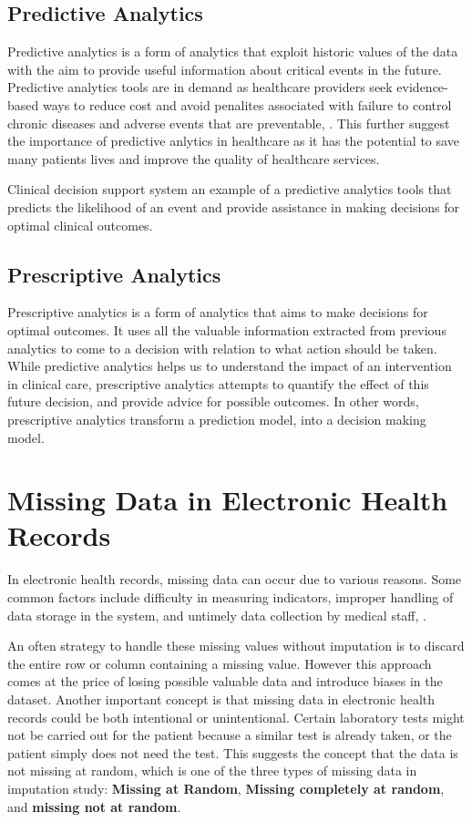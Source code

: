 \documentclass{l4proj}
\begin{document}
\subsection{Predictive Analytics}
Predictive analytics is a form of analytics that exploit historic values of the data with the aim to provide useful information about critical events in the future. Predictive analytics tools are in demand as healthcare providers seek evidence-based ways to reduce cost and avoid penalites associated with failure to control chronic diseases and adverse events that are preventable, \cite{healthcareML}. This further suggest the importance of predictive anlytics in healthcare as it has the potential to save many patients lives and improve the quality of healthcare services.

Clinical decision support system an example of a predictive analytics tools that predicts the likelihood of an event and provide assistance in making decisions for optimal clinical outcomes. 

\subsection{Prescriptive Analytics}
Prescriptive analytics is a form of analytics that aims to make decisions for optimal outcomes. It uses all the valuable information extracted from previous analytics to come to a decision with relation to what action should be taken. While predictive analytics helps us to understand the impact of an intervention in clinical care, prescriptive analytics attempts to quantify the effect of this future decision, and provide advice for possible outcomes. In other words, prescriptive analytics transform a prediction model, into a decision making model.


\section{Missing Data in Electronic Health Records}

In electronic health records, missing data can occur due to various reasons. Some common factors include difficulty in measuring indicators, improper handling of data storage in the system, and untimely data collection by medical staff, \cite{Wang2022}.

An often strategy to handle these missing values without imputation is to discard the entire row or column containing a missing value. However this approach comes at the price of losing possible valuable data and introduce biases in the dataset. Another important concept is that missing data in electronic health records could be both intentional or unintentional. Certain laboratory tests might not be carried out for the patient because a similar test is already taken, or the patient simply does not need the test. This suggests the concept that the data is not missing at random, which is one of the three types of missing data in imputation study: \textbf{Missing at Random}, \textbf{Missing completely at random}, and \textbf{missing not at random}.
\end{document}
